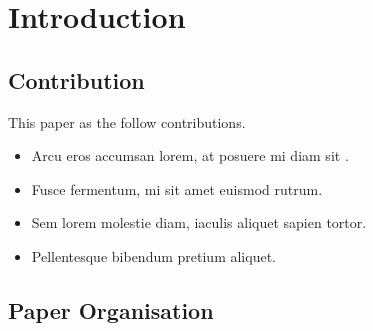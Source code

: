 \section{Introduction}
\blindtext

\subsection{Contribution}
This paper as the follow contributions.

\begin{itemize}
	\item Arcu eros accumsan lorem, at posuere mi diam sit .
	\item Fusce fermentum, mi sit amet euismod rutrum.
	\item Sem lorem molestie diam, iaculis aliquet sapien tortor.
	\item Pellentesque bibendum pretium aliquet.
\end{itemize}

\subsection{Paper Organisation}
\blindtext